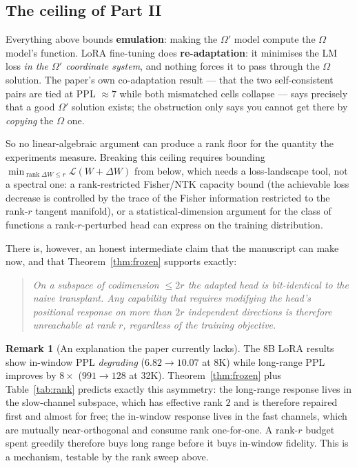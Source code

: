 \documentclass[11pt]{article}
\theoremstyle{definition}
\newtheorem{remark}[theorem]{Remark}
\DeclareMathOperator{\rank}{rank}
\begin{document}
\subsection{The ceiling of Part II}
\label{sec:ceiling2}

Everything above bounds \textbf{emulation}: making the $\Omega'$ model compute the $\Omega$ model's
function. LoRA fine-tuning does \textbf{re-adaptation}: it minimises the LM loss \emph{in the
$\Omega'$ coordinate system}, and nothing forces it to pass through the $\Omega$ solution. The
paper's own co-adaptation result --- that the two self-consistent pairs are tied at PPL $\approx7$
while both mismatched cells collapse --- says precisely that a good $\Omega'$ solution exists; the
obstruction only says you cannot get there by \emph{copying} the $\Omega$ one.

So no linear-algebraic argument can produce a rank floor for the quantity the experiments measure.
Breaking this ceiling requires bounding
$\min_{\rank\Delta W\le r}\mathcal L(W+\Delta W)$ from below, which needs a
loss-landscape tool, not a spectral one: a rank-restricted Fisher/NTK capacity bound
(the achievable loss decrease is controlled by the trace of the Fisher information restricted to
the rank-$r$ tangent manifold), or a statistical-dimension argument for the class of functions a
rank-$r$-perturbed head can express on the training distribution.

There is, however, an honest intermediate claim that the manuscript can make now, and that
Theorem~\ref{thm:frozen} supports exactly:
\begin{quote}
\emph{On a subspace of codimension $\le2r$ the adapted head is bit-identical to the naive
transplant. Any capability that requires modifying the head's positional response on more than $2r$
independent directions is therefore unreachable at rank $r$, regardless of the training objective.}
\end{quote}

\begin{remark}[An explanation the paper currently lacks]
The 8B LoRA results show in-window PPL \emph{degrading} ($6.82\to10.07$ at 8K) while long-range PPL
improves by $8\times$ ($991\to128$ at 32K). Theorem~\ref{thm:frozen} plus Table~\ref{tab:rank}
predicts exactly this asymmetry: the long-range response lives in the slow-channel subspace, which
has effective rank $2$ and is therefore repaired first and almost for free; the in-window response
lives in the fast channels, which are mutually near-orthogonal and consume rank one-for-one. A
rank-$r$ budget spent greedily therefore buys long range before it buys in-window fidelity. This is
a mechanism, testable by the rank sweep above.
\end{remark}
\end{document}
